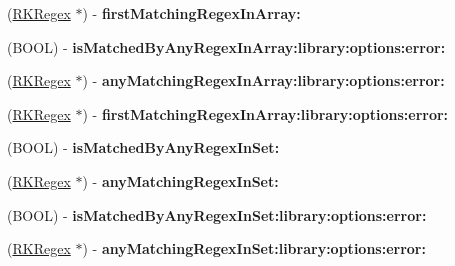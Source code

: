 \begin{DoxyCompactItemize}
\item 
\hypertarget{interface_n_s_object_07_regex_kit_additions_08_ae699a6853f000d571d0ceec495f45f91}{(\hyperlink{interface_r_k_regex}{R\-K\-Regex} $\ast$) -\/ {\bfseries first\-Matching\-Regex\-In\-Array\-:}}\label{interface_n_s_object_07_regex_kit_additions_08_ae699a6853f000d571d0ceec495f45f91}

\item 
\hypertarget{interface_n_s_object_07_regex_kit_additions_08_a68be21512bf65e926127dcad8dea28e8}{(B\-O\-O\-L) -\/ {\bfseries is\-Matched\-By\-Any\-Regex\-In\-Array\-:library\-:options\-:error\-:}}\label{interface_n_s_object_07_regex_kit_additions_08_a68be21512bf65e926127dcad8dea28e8}

\item 
\hypertarget{interface_n_s_object_07_regex_kit_additions_08_a1551ea492fb037fe491afc2769552223}{(\hyperlink{interface_r_k_regex}{R\-K\-Regex} $\ast$) -\/ {\bfseries any\-Matching\-Regex\-In\-Array\-:library\-:options\-:error\-:}}\label{interface_n_s_object_07_regex_kit_additions_08_a1551ea492fb037fe491afc2769552223}

\item 
\hypertarget{interface_n_s_object_07_regex_kit_additions_08_a0a3a752010fc4ace31b335238aa9a5ce}{(\hyperlink{interface_r_k_regex}{R\-K\-Regex} $\ast$) -\/ {\bfseries first\-Matching\-Regex\-In\-Array\-:library\-:options\-:error\-:}}\label{interface_n_s_object_07_regex_kit_additions_08_a0a3a752010fc4ace31b335238aa9a5ce}

\item 
\hypertarget{interface_n_s_object_07_regex_kit_additions_08_af66544d1bee273f94d7a8ad709cad29e}{(B\-O\-O\-L) -\/ {\bfseries is\-Matched\-By\-Any\-Regex\-In\-Set\-:}}\label{interface_n_s_object_07_regex_kit_additions_08_af66544d1bee273f94d7a8ad709cad29e}

\item 
\hypertarget{interface_n_s_object_07_regex_kit_additions_08_a69a9635423db7d68d48bbbf043055b40}{(\hyperlink{interface_r_k_regex}{R\-K\-Regex} $\ast$) -\/ {\bfseries any\-Matching\-Regex\-In\-Set\-:}}\label{interface_n_s_object_07_regex_kit_additions_08_a69a9635423db7d68d48bbbf043055b40}

\item 
\hypertarget{interface_n_s_object_07_regex_kit_additions_08_a28b2ac22315f9e5efb8941e3b49f4c45}{(B\-O\-O\-L) -\/ {\bfseries is\-Matched\-By\-Any\-Regex\-In\-Set\-:library\-:options\-:error\-:}}\label{interface_n_s_object_07_regex_kit_additions_08_a28b2ac22315f9e5efb8941e3b49f4c45}

\item 
\hypertarget{interface_n_s_object_07_regex_kit_additions_08_a51c9e76d907923cc352a4170f8eb2487}{(\hyperlink{interface_r_k_regex}{R\-K\-Regex} $\ast$) -\/ {\bfseries any\-Matching\-Regex\-In\-Set\-:library\-:options\-:error\-:}}\label{interface_n_s_object_07_regex_kit_additions_08_a51c9e76d907923cc352a4170f8eb2487}

\end{DoxyCompactItemize}


